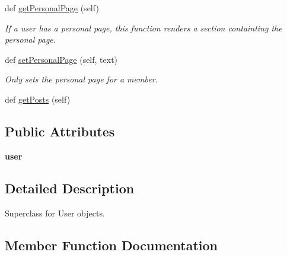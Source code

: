 \begin{DoxyCompactItemize}
def \mbox{\hyperlink{classforum_1_1models_1_1_base_user_aee7a5296d2a56983d2da2ea53d7f757d}{get\+Personal\+Page}} (self)
\begin{DoxyCompactList}\small\item\em If a user has a personal page, this function renders a section containting the personal page. \end{DoxyCompactList}\item 
\mbox{\label{classforum_1_1models_1_1_base_user_aa0b62757d9c42d0c1d7e99b33d17ac64}} 
def \mbox{\hyperlink{classforum_1_1models_1_1_base_user_aa0b62757d9c42d0c1d7e99b33d17ac64}{set\+Personal\+Page}} (self, text)
\begin{DoxyCompactList}\small\item\em Only sets the personal page for a member. \end{DoxyCompactList}\item 
def \mbox{\hyperlink{classforum_1_1models_1_1_base_user_a1dbfb7a7c3370eb4fa6ff9b32cd8dc91}{get\+Posts}} (self)
\end{DoxyCompactItemize}
\subsection*{Public Attributes}
\begin{DoxyCompactItemize}
\item 
\mbox{\label{classforum_1_1models_1_1_base_user_a68c360e944386b97c2fd0da02b0d8334}} 
{\bfseries user}
\end{DoxyCompactItemize}


\subsection{Detailed Description}
Superclass for User objects. 

\subsection{Member Function Documentation}
\mbox{\label{classforum_1_1models_1_1_base_user_aee7a5296d2a56983d2da2ea53d7f757d}} 
